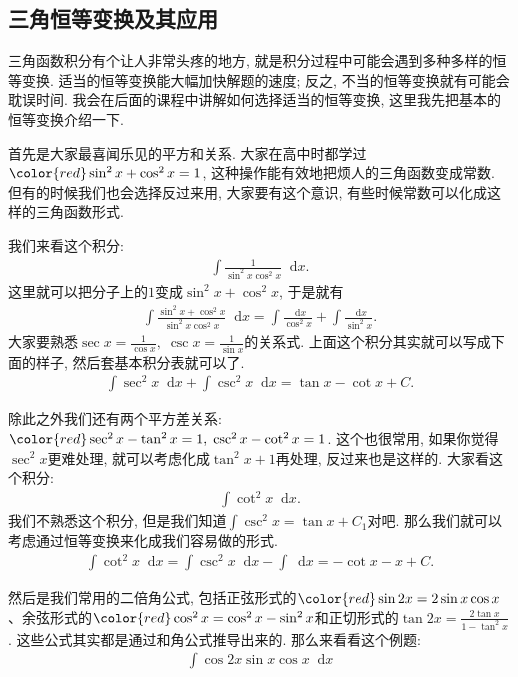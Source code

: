 \documentclass{ctexbook}
\newcommand*{\dif}{\mathop{}\!\mathrm{d}}
\begin{document}
{\subsection{三角恒等变换及其应用}
三角函数积分有个让人非常头疼的地方, 就是积分过程中可能会遇到多种多样的恒等变换. 适当的恒等变换能大幅加快解题的速度; 反之, 不当的恒等变换就有可能会耽误时间. 我会在后面的课程中讲解如何选择适当的恒等变换, 这里我先把基本的恒等变换介绍一下. \par
首先是大家最喜闻乐见的平方和关系. 大家在高中时都学过$\color{red}\sin^{2}{x}+\cos^{2}{x}=1$, 这种操作能有效地把烦人的三角函数变成常数. 但有的时候我们也会选择反过来用, 大家要有这个意识, 有些时候常数可以化成这样的三角函数形式. \par
我们来看这个积分: 
\begin{align*}
\int\frac{1}{\sin^{2}{x}\cos^{2}{x}}\dif{x}
.\end{align*}
这里就可以把分子上的$1$变成$\sin^{2}{x}+\cos^{2}{x}$, 于是就有
\begin{align*}
\int\frac{\sin^{2}{x}+\cos^{2}{x}}{\sin^{2}{x}\cos^{2}{x}}\dif{x}=\int\frac{\dif{x}}{\cos^{2}{x}}+\int\frac{\dif{x}}{\sin^{2}{x}}
.\end{align*}
大家要熟悉$\sec{x}=\frac{1}{\cos{x}},\;\csc{x}=\frac{1}{\sin{x}}$的关系式. 上面这个积分其实就可以写成下面的样子, 然后套基本积分表就可以了. 
\begin{align*}
\int\sec^{2}{x}\dif{x}+\int\csc^{2}{x}\dif{x}=\tan{x}-\cot{x}+C
.\end{align*}\par
除此之外我们还有两个平方差关系: $\color{red}\sec^{2}{x}-\tan^{2}{x}=1,\;\csc^{2}{x}-\cot^{2}{x}=1$. 这个也很常用, 如果你觉得$\sec^{2}{x}$更难处理, 就可以考虑化成$\tan^{2}{x}+1$再处理, 反过来也是这样的. 大家看这个积分: 
\begin{align*}
\int\cot^{2}{x}\dif{x}
.\end{align*}
我们不熟悉这个积分, 但是我们知道$\int\csc^{2}{x}=\tan{x}+C_{1}$对吧. 那么我们就可以考虑通过恒等变换来化成我们容易做的形式. 
\begin{align*}
\int\cot^{2}{x}\dif{x}=\int\csc^{2}{x}\dif{x}-\int\dif{x}=-\cot{x}-x+C
.\end{align*}\par
然后是我们常用的二倍角公式, 包括正弦形式的$\color{red}\sin{2x}=2\sin{x}\cos{x}$、余弦形式的$\color{red}\cos^{2}{x}=\cos^{2}{x}-\sin^{2}{x}$和正切形式的$\tan{2x}=\frac{2\tan{x}}{1-\tan^{2}{x}}$. 这些公式其实都是通过和角公式推导出来的. 那么来看看这个例题: 
\begin{align*}
\int\cos{2x}\sin{x}\cos{x}\dif{x}

\end{align*}}
\end{document}
